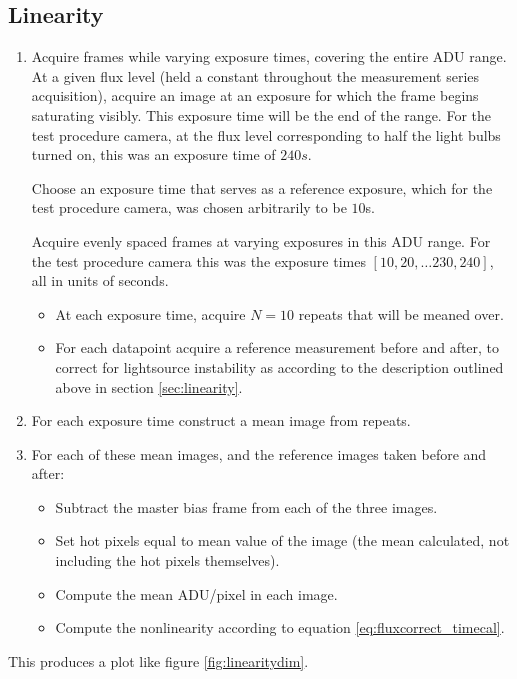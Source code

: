 \documentclass[../main.tex]{subfiles}
\begin{document}
		\subsection{Linearity}
		\begin{enumerate}
			\item Acquire frames while varying exposure times, covering the entire ADU range. At a given flux level (held a constant throughout the measurement series acquisition), acquire an image at an exposure for which the frame begins saturating visibly. This exposure time will be the end of the range. For the test procedure camera, at the flux level corresponding to half the light bulbs turned on, this was an exposure time of $240s$. 
			
			Choose an exposure time that serves as a reference exposure, which for the test procedure camera, was chosen arbitrarily to be $10$s. 
			
			Acquire evenly spaced frames at varying exposures in this ADU range. For the test procedure camera this was the exposure times
			$[10, 20, \dots 230, 240]$, all in units of seconds.
			\begin{itemize}
				\item At each exposure time, acquire $N = 10$ repeats that will be meaned over.
				\item For each datapoint acquire a reference measurement before and after, to correct for lightsource instability as according to the description outlined above in section \ref{sec:linearity}.
			\end{itemize}
			\item For each exposure time construct a mean image from repeats.
			\item For each of these mean images, and the reference images taken before and after:
			\begin{itemize}
				\item Subtract the master bias frame from each of the three images.
				\item Set hot pixels equal to mean value of the image (the mean calculated, not including the hot pixels themselves).
				\item Compute the mean ADU/pixel in each image.
				\item Compute the nonlinearity according to equation \ref{eq:fluxcorrect_timecal}.
			\end{itemize}
		\end{enumerate}
		
		This produces a plot like figure \ref{fig:linearitydim}.
		
\end{document}
